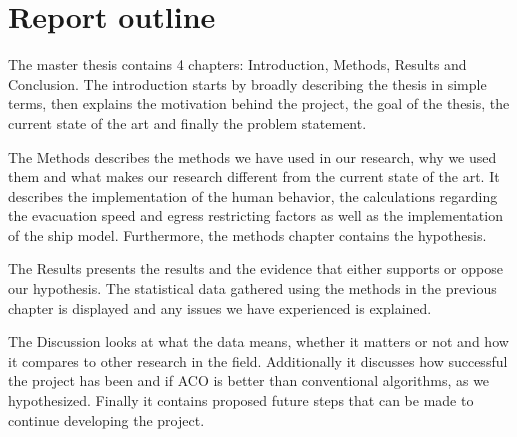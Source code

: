 \section{Report outline}

The master thesis contains 4 chapters: Introduction, Methods, Results and Conclusion.               
The introduction starts by broadly describing the thesis in simple terms, then explains the motivation behind the project,
the goal of the thesis, the current state of the art and finally the problem statement. 

The Methods describes the methods we have used in our research, why we used them and what makes
our research different from the current state of the art. It describes the implementation of the human behavior,
the calculations regarding the evacuation speed and egress restricting factors as well as the implementation of the 
ship model. Furthermore, the methods chapter contains the hypothesis.

The Results presents the results and the evidence that either supports or oppose our hypothesis. The
statistical data gathered using the methods in the previous chapter is displayed and any issues we have experienced
is explained.

The Discussion looks at what the data means, whether it matters or not and how it compares to other research in the field.
Additionally it discusses how successful the project has been and if ACO is better than conventional algorithms, as we hypothesized.
Finally it contains proposed future steps that can be made to continue developing the project.
